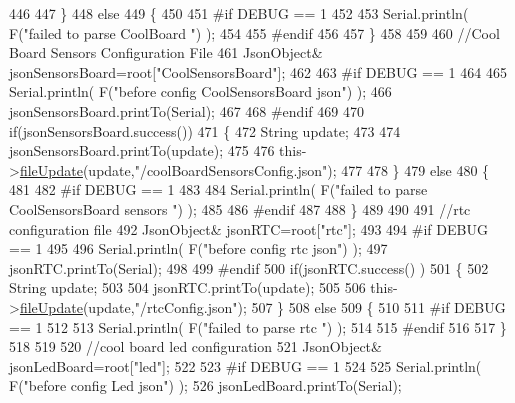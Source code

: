 \begin{DoxyCode}
446         
447     \}
448     \textcolor{keywordflow}{else}
449     \{
450     
451 \textcolor{preprocessor}{    #if DEBUG == 1 }
452 
453         Serial.println( F(\textcolor{stringliteral}{"failed to parse CoolBoard "}) );
454     
455 \textcolor{preprocessor}{    #endif}
456 
457     \}       
458 
459     
460     \textcolor{comment}{//Cool Board Sensors Configuration File}
461         JsonObject& jsonSensorsBoard=root[\textcolor{stringliteral}{"CoolSensorsBoard"}];
462 
463 \textcolor{preprocessor}{#if DEBUG == 1 }
464 
465     Serial.println( F(\textcolor{stringliteral}{"before config CoolSensorsBoard json"}) );
466     jsonSensorsBoard.printTo(Serial);
467 
468 \textcolor{preprocessor}{#endif }
469     
470     \textcolor{keywordflow}{if}(jsonSensorsBoard.success())
471     \{   
472         String update;
473     
474         jsonSensorsBoard.printTo(update);
475 
476         this->\hyperlink{class_cool_file_system_a13f2958f5b87757c31fc53797a30d23a}{fileUpdate}(update,\textcolor{stringliteral}{"/coolBoardSensorsConfig.json"});      
477 
478     \}
479     \textcolor{keywordflow}{else}
480     \{
481 
482 \textcolor{preprocessor}{    #if DEBUG == 1}
483 
484         Serial.println( F(\textcolor{stringliteral}{"failed to parse CoolSensorsBoard sensors "}) );   
485     
486 \textcolor{preprocessor}{    #endif}
487 
488     \}
489 
490     
491     \textcolor{comment}{//rtc configuration file}
492         JsonObject& jsonRTC=root[\textcolor{stringliteral}{"rtc"}];
493 
494 \textcolor{preprocessor}{#if DEBUG == 1 }
495     
496     Serial.println( F(\textcolor{stringliteral}{"before config rtc json"}) );
497     jsonRTC.printTo(Serial);
498 
499 \textcolor{preprocessor}{#endif}
500     \textcolor{keywordflow}{if}(jsonRTC.success() )
501     \{
502         String update;
503 
504         jsonRTC.printTo(update);
505 
506         this->\hyperlink{class_cool_file_system_a13f2958f5b87757c31fc53797a30d23a}{fileUpdate}(update,\textcolor{stringliteral}{"/rtcConfig.json"});           
507     \}
508     \textcolor{keywordflow}{else}
509     \{
510     
511 \textcolor{preprocessor}{    #if DEBUG == 1 }
512 
513         Serial.println( F(\textcolor{stringliteral}{"failed to parse rtc "}) );
514     
515 \textcolor{preprocessor}{    #endif}
516 
517     \}
518     
519     
520         \textcolor{comment}{//cool board led configuration}
521         JsonObject& jsonLedBoard=root[\textcolor{stringliteral}{"led"}];
522     
523 \textcolor{preprocessor}{#if DEBUG == 1 }
524 
525     Serial.println( F(\textcolor{stringliteral}{"before config Led json"}) );
526     jsonLedBoard.printTo(Serial);

\end{DoxyCode}
